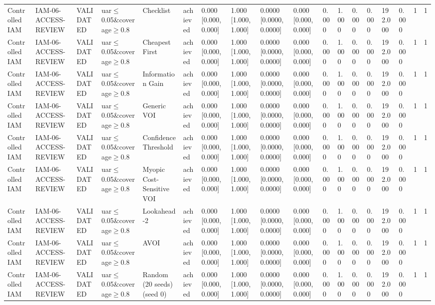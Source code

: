 \begin{table}[!ht]
{\begin{tabular}{llllllllllllllllll}
Controlled IAM & IAM-06-ACCESS-REVIEW & VALIDATED & uar$\le$0.05\&coverage$\ge$0.8 & Checklist & achieved & 0.000 [0.000, 0.000] & 1.000 [1.000, 1.000] & 0.0000 [0.0000, 0.0000] & 0.000 [0.000, 0.000] & 0.000 & 1.000 & 0.000 & 0.000 & 192.000 & 0.000 & 1 & 1 \\
Controlled IAM & IAM-06-ACCESS-REVIEW & VALIDATED & uar$\le$0.05\&coverage$\ge$0.8 & Cheapest First & achieved & 0.000 [0.000, 0.000] & 1.000 [1.000, 1.000] & 0.0000 [0.0000, 0.0000] & 0.000 [0.000, 0.000] & 0.000 & 1.000 & 0.000 & 0.000 & 192.000 & 0.000 & 1 & 1 \\
Controlled IAM & IAM-06-ACCESS-REVIEW & VALIDATED & uar$\le$0.05\&coverage$\ge$0.8 & Information Gain & achieved & 0.000 [0.000, 0.000] & 1.000 [1.000, 1.000] & 0.0000 [0.0000, 0.0000] & 0.000 [0.000, 0.000] & 0.000 & 1.000 & 0.000 & 0.000 & 192.000 & 0.000 & 1 & 1 \\
Controlled IAM & IAM-06-ACCESS-REVIEW & VALIDATED & uar$\le$0.05\&coverage$\ge$0.8 & Generic VOI & achieved & 0.000 [0.000, 0.000] & 1.000 [1.000, 1.000] & 0.0000 [0.0000, 0.0000] & 0.000 [0.000, 0.000] & 0.000 & 1.000 & 0.000 & 0.000 & 192.000 & 0.000 & 1 & 1 \\
Controlled IAM & IAM-06-ACCESS-REVIEW & VALIDATED & uar$\le$0.05\&coverage$\ge$0.8 & Confidence Threshold & achieved & 0.000 [0.000, 0.000] & 1.000 [1.000, 1.000] & 0.0000 [0.0000, 0.0000] & 0.000 [0.000, 0.000] & 0.000 & 1.000 & 0.000 & 0.000 & 192.000 & 0.000 & 1 & 1 \\
Controlled IAM & IAM-06-ACCESS-REVIEW & VALIDATED & uar$\le$0.05\&coverage$\ge$0.8 & Myopic Cost-Sensitive VOI & achieved & 0.000 [0.000, 0.000] & 1.000 [1.000, 1.000] & 0.0000 [0.0000, 0.0000] & 0.000 [0.000, 0.000] & 0.000 & 1.000 & 0.000 & 0.000 & 192.000 & 0.000 & 1 & 1 \\
Controlled IAM & IAM-06-ACCESS-REVIEW & VALIDATED & uar$\le$0.05\&coverage$\ge$0.8 & Lookahead-2 & achieved & 0.000 [0.000, 0.000] & 1.000 [1.000, 1.000] & 0.0000 [0.0000, 0.0000] & 0.000 [0.000, 0.000] & 0.000 & 1.000 & 0.000 & 0.000 & 192.000 & 0.000 & 1 & 1 \\
Controlled IAM & IAM-06-ACCESS-REVIEW & VALIDATED & uar$\le$0.05\&coverage$\ge$0.8 & AVOI & achieved & 0.000 [0.000, 0.000] & 1.000 [1.000, 1.000] & 0.0000 [0.0000, 0.0000] & 0.000 [0.000, 0.000] & 0.000 & 1.000 & 0.000 & 0.000 & 192.000 & 0.000 & 1 & 1 \\
Controlled IAM & IAM-06-ACCESS-REVIEW & VALIDATED & uar$\le$0.05\&coverage$\ge$0.8 & Random (20 seeds) (seed 0) & achieved & 0.000 [0.000, 0.000] & 1.000 [1.000, 1.000] & 0.0000 [0.0000, 0.0000] & 0.000 [0.000, 0.000] & 0.000 & 1.000 & 0.000 & 0.000 & 192.000 & 0.000 & 1 & 1 \\

\end{tabular}}
\end{table}
